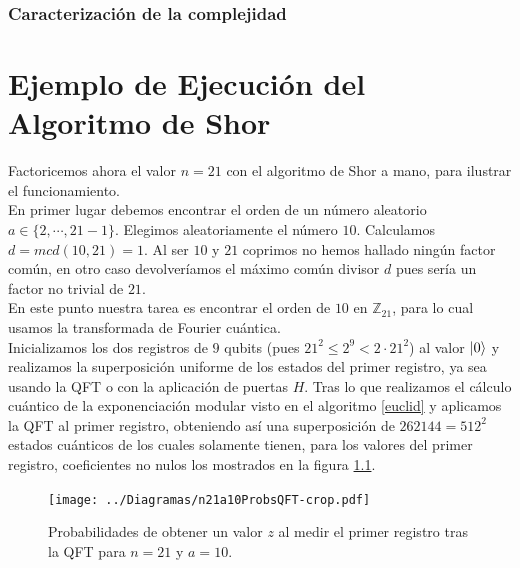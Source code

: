 \documentclass[11pt, spanish]{report}
\numberwithin{equation}{section}
\numberwithin{defin}{section}
\begin{document}
\begin{appendices}
\subsection{Caracterización de la complejidad}

\chapter{Ejemplo de Ejecución del Algoritmo de Shor}

Factoricemos ahora el valor $n=21$ con el algoritmo de Shor a mano, para ilustrar el funcionamiento.\\

En primer lugar debemos encontrar el orden de un número aleatorio $a\in\{2,\cdots, 21-1\}$. Elegimos aleatoriamente el número $10$. Calculamos  $d=mcd(10,21)=1$. Al ser $10$ y $21$ coprimos no hemos hallado ningún factor común, en otro caso devolveríamos el máximo común divisor $d$ pues sería un factor no trivial de $21$.\\

En este punto nuestra tarea es encontrar el orden de $10$ en $\mathbb{Z}_{21}$, para lo cual usamos la transformada de Fourier cuántica.\\

Inicializamos los dos registros de $9$ qubits (pues $21^2\leq 2^9<2\cdot 21^2$) al valor $\ket{0}$ y realizamos la superposición uniforme de los estados del primer registro, ya sea usando la QFT o con la aplicación de puertas $H$. Tras lo que realizamos el cálculo cuántico de la exponenciación modular visto en el algoritmo \ref{euclid} y aplicamos la QFT al primer registro, obteniendo así una superposición de $262144=512^2$ estados cuánticos de los cuales solamente tienen, para los valores del primer registro, coeficientes no nulos los mostrados en la figura \ref{fig_probsQFT}. \\

\begin{figure}
\begin{center}
\texttt{[image: ../Diagramas/n21a10ProbsQFT-crop.pdf]}
\caption{Probabilidades de obtener un valor $z$ al medir el primer registro tras la QFT para $n=21$ y $a=10$.} \label{fig_probsQFT}
\end{center}
\end{figure}


\end{appendices}
\end{document}
